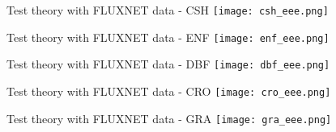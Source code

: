 \documentclass[aspectratio=169]{beamer}
\begin{document}
    \begin{frame}{Test theory with FLUXNET data - CSH}
                \texttt{[image: csh\_eee.png]}
     \end{frame}


    \begin{frame}{Test theory with FLUXNET data - ENF}
                \texttt{[image: enf\_eee.png]}
     \end{frame}


    \begin{frame}{Test theory with FLUXNET data - DBF}
                \texttt{[image: dbf\_eee.png]}
     \end{frame}

    \begin{frame}{Test theory with FLUXNET data - CRO}
                \texttt{[image: cro\_eee.png]}
     \end{frame}

    \begin{frame}{Test theory with FLUXNET data - GRA}
                \texttt{[image: gra\_eee.png]}
     \end{frame}



\end{document}
